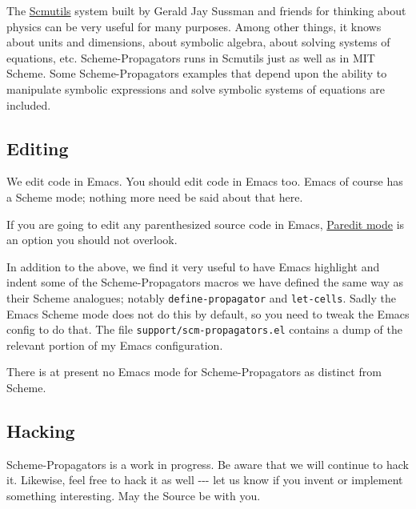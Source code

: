 \documentclass[12pt,letterpaper,english]{article}
\begin{document}
The \href{http://groups.csail.mit.edu/mac/users/gjs/6946/linux-install.htm}{Scmutils} system built by Gerald Jay Sussman and friends for
thinking about physics can be very useful for many purposes.  Among
other things, it knows about units and dimensions, about symbolic
algebra, about solving systems of equations, etc.  Scheme-Propagators
runs in Scmutils just as well as in MIT Scheme.  Some
Scheme-Propagators examples that depend upon the ability to manipulate
symbolic expressions and solve symbolic systems of equations are
included.



\hypertarget{editing}{}
\subsection{Editing}
\label{editing}

We edit code in Emacs.  You should edit code in Emacs too.  Emacs of
course has a Scheme mode; nothing more need be said about that here.

If you are going to edit any parenthesized source code in Emacs,
\href{http://www.emacswiki.org/emacs/ParEdit}{Paredit mode} is an option you should not overlook.

In addition to the above, we find it very useful to have Emacs
highlight and indent some of the Scheme-Propagators macros we have
defined the same way as their Scheme analogues; notably
\texttt{define-propagator} and \texttt{let-cells}.  Sadly the
Emacs Scheme mode does not do this by default, so you need to tweak
the Emacs config to do that.  The file \texttt{support/scm-propagators.el}
contains a dump of the relevant portion of my Emacs configuration.

There is at present no Emacs mode for Scheme-Propagators as distinct
from Scheme.



\hypertarget{hacking}{}
\subsection{Hacking}
\label{hacking}

Scheme-Propagators is a work in progress.  Be aware that we will
continue to hack it.  Likewise, feel free to hack it as well -{}-{}- let
us know if you invent or implement something interesting.  May the
Source be with you.
\end{document}
